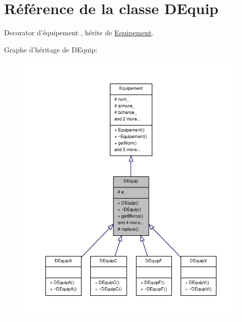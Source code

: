 \hypertarget{class_d_equip}{\section{Référence de la classe D\-Equip}
\label{class_d_equip}
}


Decorator d'équipement , hérite de \hyperlink{class_equipement}{Equipement}.  




Graphe d'héritage de D\-Equip\-:
\nopagebreak
\begin{figure}[H]
\begin{center}
\leavevmode
\includegraphics[width=350pt]{class_d_equip__inherit__graph}
\end{center}
\end{figure}


